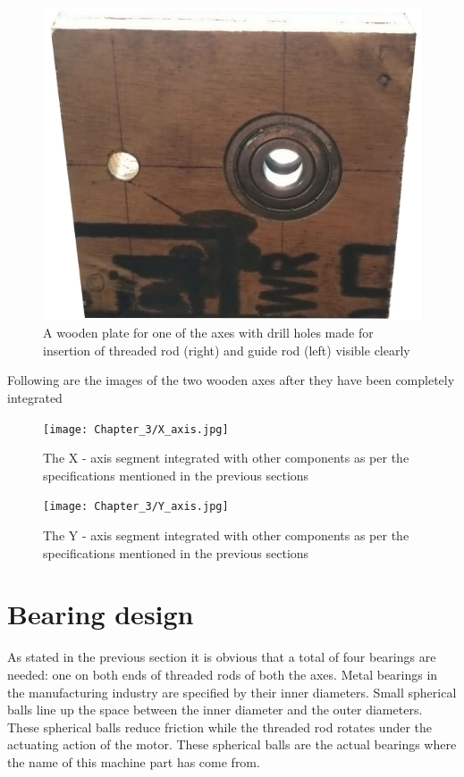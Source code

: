 \begin{figure}[h]
    \centering
    \includegraphics[scale=0.3]{images/Chapter_3/XY_plate.jpg}
    \caption{A wooden plate for one of the axes with drill holes made for insertion of threaded rod (right) and guide rod (left) visible clearly}
    \label{fig:plate}
\end{figure} \pagebreak

Following are the images of the two wooden axes after they have been completely integrated

\begin{figure}[h]
    \centering
        \texttt{[image: Chapter\_3/X\_axis.jpg]}
    \caption{The X -  axis segment integrated with other components as per the specifications mentioned in the previous sections}
    \label{fig:x_axis_complete}
\end{figure}

\begin{figure}[h]
    \centering
        \texttt{[image: Chapter\_3/Y\_axis.jpg]}
    \caption{The Y -  axis segment integrated with other components as per the specifications mentioned in the previous sections}
    \label{fig:y_axis_complete}
\end{figure}

\section{Bearing design} 

As stated in the previous section it is obvious that a total of four bearings are needed: one on both ends of threaded rods of both the axes. Metal bearings in the manufacturing industry are specified by their inner diameters. Small spherical balls line up the space between the inner diameter and the outer diameters. These spherical balls reduce friction while the threaded rod rotates under the actuating action of the motor. These spherical balls are the actual bearings where the name of this machine part has come from. \par

